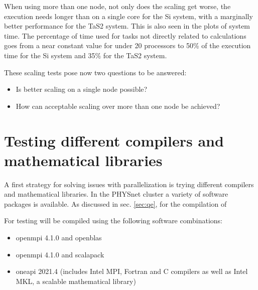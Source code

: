 \documentclass[main.tex]{subfiles}
\begin{document}
When using more than one node, not only does the scaling get worse, the execution needs longer than on a single core for the Si system, with a marginally better performance for the TaS2 system.
This is also seen in the plots of system time. The percentage of time used for tasks not directly related to calculations goes from a near constant value for under 20 processors to 50\% of the execution time for the Si system and 35\% for the TaS2 system.

These scaling tests pose now two questions to be answered:
\begin{itemize}
    \item Is better scaling on a single node possible?
    \item How can acceptable scaling over more than one node be achieved?
\end{itemize}

\section{Testing different compilers and mathematical libraries}

A first strategy for solving issues with parallelization is trying different compilers and mathematical libraries.
In the PHYSnet cluster a variety of software packages is available.
As discussed in sec. \ref{sec:qe}, for the compilation of \QE 

For testing \QE will be compiled using the following software combinations:
\begin{itemize}
    \item \gls{openmpi} 4.1.0 and \gls{openblas}
    \item \gls{openmpi} 4.1.0 and \gls{scalapack}
    \item \gls{oneapi} 2021.4 (includes Intel MPI, Fortran and C compilers as well as Intel MKL, a scalable mathematical library)
\end{itemize}
\end{document}
